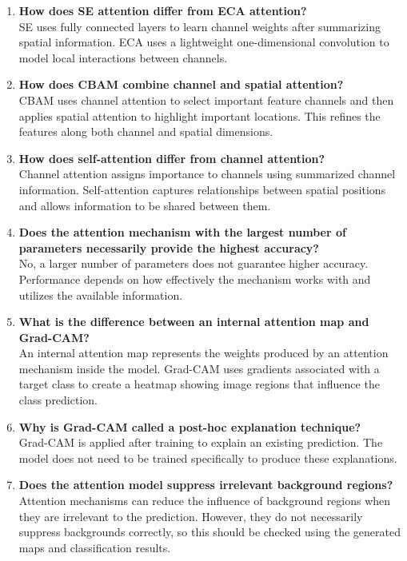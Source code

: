 \documentclass[10pt]{article}
\begin{document}
\begin{enumerate}
\item \textbf{How does SE attention differ from ECA attention?}\\
SE uses fully connected layers to learn channel weights after summarizing spatial information. ECA uses a lightweight one-dimensional convolution to model local interactions between channels.

\item \textbf{How does CBAM combine channel and spatial attention?}\\
CBAM uses channel attention to select important feature channels and then applies spatial attention to highlight important locations. This refines the features along both channel and spatial dimensions.

\item \textbf{How does self-attention differ from channel attention?}\\
Channel attention assigns importance to channels using summarized channel information. Self-attention captures relationships between spatial positions and allows information to be shared between them.

\item \textbf{Does the attention mechanism with the largest number of parameters necessarily provide the highest accuracy?}\\
No, a larger number of parameters does not guarantee higher accuracy. Performance depends on how effectively the mechanism works with and utilizes the available information.

\item \textbf{What is the difference between an internal attention map and Grad-CAM?}\\
An internal attention map represents the weights produced by an attention mechanism inside the model. Grad-CAM uses gradients associated with a target class to create a heatmap showing image regions that influence the class prediction.

\item \textbf{Why is Grad-CAM called a post-hoc explanation technique?}\\
Grad-CAM is applied after training to explain an existing prediction. The model does not need to be trained specifically to produce these explanations.

\item \textbf{Does the attention model suppress irrelevant background regions?}\\
Attention mechanisms can reduce the influence of background regions when they are irrelevant to the prediction. However, they do not necessarily suppress backgrounds correctly, so this should be checked using the generated maps and classification results.


\end{enumerate}
\end{document}

